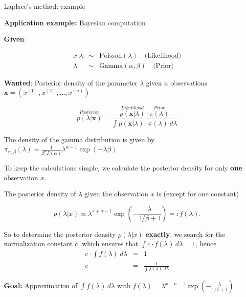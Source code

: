 \documentclass[11pt,compress,t,notes=noshow, xcolor=table]{beamer}
\begin{document}
\begin{vbframe}{Laplace's method: example}

\textbf{Application example:} Bayesian computation

\lz

\textbf{Given}:

\vspace*{-0.8cm}
\begin{eqnarray*}
x | \lambda &\sim& \text{Poisson}(\lambda) \quad \text{(Likelihood)}\\
\lambda &\sim& \text{Gamma}(\alpha, \beta) \quad \text{(Prior)}
\end{eqnarray*}

\textbf{Wanted}: Posterior density of the parameter $\lambda$ given $n$ observations $\bm{x} = \left(x^{(1)}, x^{(2)}, ..., x^{(n)}\right)$

$$
\overset{Posterior}{p(\lambda | \bm{x})} = \frac{\overset{Likelihood}{p(\bm{x} | \lambda)} \cdot \overset{Prior}{\pi(\lambda)}}{\int p(\bm{x} | \lambda) \cdot \pi(\lambda) ~ d\lambda}
$$

\vfill

\begin{footnotesize}
The density of the gamma distribution is given by $\pi_{\alpha, \beta}(\lambda) = \frac{1}{\beta^\alpha\Gamma(\alpha)}\lambda^{\alpha-1}\exp(-\lambda \beta)$
\end{footnotesize}

\framebreak

To keep the calculations simple, we calculate the posterior density for only \textbf{one} observation $x$.

\lz

The posterior density of $\lambda$ given the observation $x$ is (except for one constant)

$$
p(\lambda | x) \propto \lambda^{x + \alpha - 1} \exp\left(- \frac{\lambda}{1 / \beta + 1}\right) =: f(\lambda).
$$

So to determine the posterior density $p(\lambda|x)$ \textbf{exactly}, we search for the normalization constant $c$, which ensures that $\int c \cdot f(\lambda) ~d\lambda = 1$, hence
\vspace*{-0.3cm}
\begin{eqnarray*}
c \cdot \int f(\lambda) ~ d\lambda &=& 1 \\
c  &=& \frac{1}{\int f(\lambda)~d\lambda}
\end{eqnarray*}

\framebreak

\textbf{Goal:} Approximation of $\int f(\lambda)~d\lambda$ with $f(\lambda) = \lambda^{x + \alpha - 1} \exp\left(- \frac{\lambda}{1 / \beta + 1}\right)$


\end{vbframe}
\end{document}
